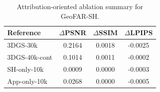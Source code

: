 ﻿\begin{table}[t]
\centering
\caption{Attribution-oriented ablation summary for GeoFAR-SH.}
\label{tab:ablation_attribution}
\small
\begin{tabular}{lccc}
\hline
Reference & $\Delta$PSNR & $\Delta$SSIM & $\Delta$LPIPS \\
\hline
3DGS-30k & 0.2164 & 0.0018 & -0.0025 \\
3DGS-40k-cont & 0.1014 & 0.0011 & -0.0002 \\
SH-only-10k & 0.0009 & 0.0000 & -0.0003 \\
App-only-10k & 0.0268 & 0.0000 & -0.0005 \\
\hline
\end{tabular}
\end{table}



